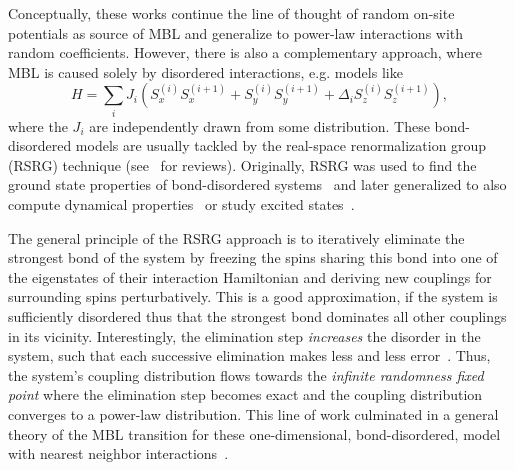 Conceptually, these works continue the line of thought of random on-site potentials as source of MBL and generalize to power-law interactions with random coefficients. However, there is also a complementary approach, where MBL is caused solely by disordered interactions, e.g. models like
\begin{equation}\label{eq:bond-disordered-XXZ}
	H = \sum_{i} J_{i} \left(S_x^{(i)}S_x^{(i+1)} + S_y^{(i)}S_y^{(i+1)} + \Delta_i S_z^{(i)}S_z^{(i+1)}\right),
\end{equation}
where the $J_{i}$ are independently drawn from some distribution. These bond-disordered models are usually tackled by the real-space renormalization group (RSRG) technique (see~\cite{igloiStrongDisorderRG2005,parameswaranEigenstatePhaseTransitions2017,igloiStrongDisorderRG2018,monthusStrongDisorderRenormalization2018} for reviews). Originally, RSRG was used to find the ground state properties of bond-disordered systems~\cite{dasguptaLowtemperaturePropertiesRandom1980,bhattScalingStudiesHighly1982,fisherRandomTransverseField1992,fisherRandomAntiferromagneticQuantum1994,fisherCriticalBehaviorRandom1995} and later generalized to also compute dynamical properties~\cite{voskManybodyLocalizationOne2013,voskDynamicalQuantumPhase2014,masonTimedependentRealspaceRenormalizationGroup2019,ruggieroQuantumInformationSpreading2022} or study excited states~\cite{pekkerHilbertGlassTransitionNew2014,vasseurQuantumCriticalityHot2015,vasseurParticleholeSymmetryManybody2016}.

The general principle of the RSRG approach is to iteratively eliminate the strongest bond of the system by freezing the spins sharing this bond into one of the eigenstates of their interaction Hamiltonian and deriving new couplings for surrounding spins perturbatively. This is a good approximation, if the system is sufficiently disordered thus that the strongest bond dominates all other couplings in its vicinity. Interestingly, the elimination step \emph{increases} the disorder in the system, such that each successive elimination makes less and less error~\cite{fisherRandomAntiferromagneticQuantum1994}. Thus, the system's coupling distribution flows towards the \emph{infinite randomness fixed point} where the elimination step becomes exact and the coupling distribution converges to a power-law distribution. This line of work culminated in a general theory of the MBL transition for these one-dimensional, bond-disordered, model with nearest neighbor interactions~\cite{voskTheoryManyBodyLocalization2015}.



